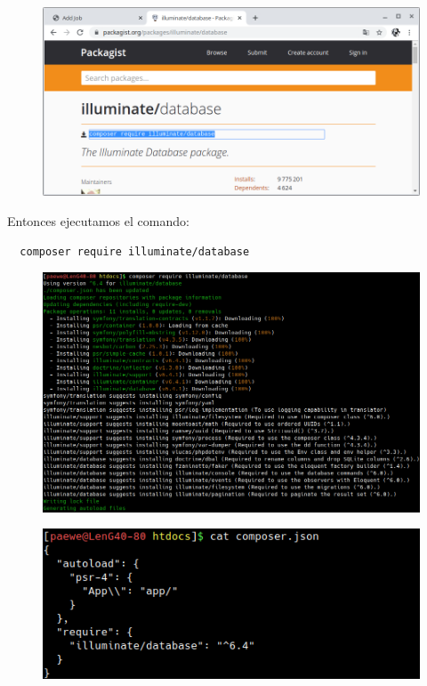 \documentclass{article}
\begin{document}
\begin{figure}[h!]
  \centering
  \includegraphics[scale=0.5]{./Pictures/073_composer_eloquent.png}
\end{figure}

Entonces ejecutamos el comando:\\

\begin{verbatim}
  composer require illuminate/database
\end{verbatim}

\begin{figure}[h!]
  \centering
  \includegraphics[scale=0.75]{./Pictures/074_composer_eloquent.png}
\end{figure}

\begin{figure}[h!]
  \centering
  \includegraphics[scale=0.75]{./Pictures/074_composer_json.png}
\end{figure}
\end{document}
